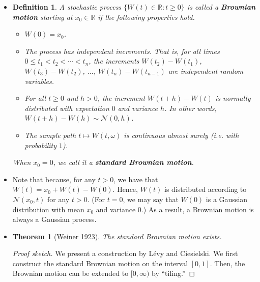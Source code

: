 \documentclass[10pt]{article}
\newtheorem{theorem}[lemma]{Theorem}
\newtheorem{definition}[lemma]{Definition}
\newcommand{\mcal}[1]{\mathcal{#1}}
\newcommand{\Real}{\mathbb{R}}
\begin{document}
\begin{itemize}
  \item \begin{definition}
    A stochastic process $\{W(t) \in \Real : t \geq 0\}$ is called a {\bf Brownian motion} starting at $x_0 \in \Real$ if the following properties hold.
    \begin{itemize}
      \item $W(0) = x_0$.
      \item The process has independent increments. That is, for all times $0 \leq t_1 < t_2 < \dotsb < t_n$, the increments $W(t_2) - W(t_1)$, $W(t_3) - W(t_2)$, $\dotsc$, $W(t_n) - W(t_{n-1})$ are independent random variables.
      \item For all $t \geq 0$ and $h > 0$, the increment $W(t+h) - W(t)$ is normally distributed with expectation $0$ and variance $h$. In other words, $W(t+h) - W(h) \sim \mcal{N}(0, h)$.
      \item The sample path $t \mapsto W(t,\omega)$ is continuous almost surely (i.e. with probability $1$).
    \end{itemize}
    When $x_0 = 0$, we call it a {\bf standard Brownian motion}.    
  \end{definition}

  \item Note that because, for any $t > 0$, we have that $W(t) = x_0 + W(t) - W(0)$. Hence, $W(t)$ is distributed according to $\mcal{N}(x_0,t)$ for any $t > 0$. (For $t = 0$, we may say that $W(0)$ is a Gaussian distribution with mean $x_0$ and variance $0$.) As a result, a Brownian motion is always a Gaussian process.
  
  \item \begin{theorem}[Weiner 1923]
    The standard Brownian motion exists.
  \end{theorem}

  \begin{proof}[Proof sketch]
    We present a construction by L\'{e}vy and Ciesielski. We first construct the standard Brownian motion on the interval $[0,1]$. Then, the Brownian motion can be extended to $[0,\infty)$ by ``tiling.''


\end{proof}
\end{itemize}
\end{document}

